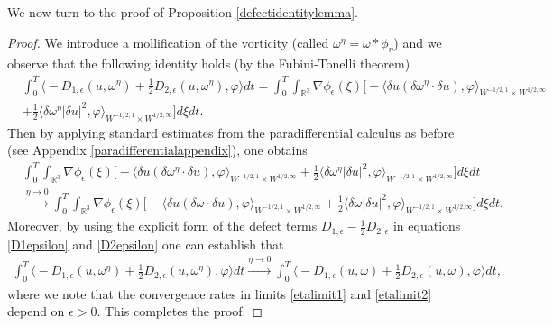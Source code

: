 \documentclass[12pt,a4paper]{article}
\theoremstyle{definition}
\theoremstyle{remark}
\numberwithin{equation}{section}
\begin{document}
We now turn to the proof of Proposition \ref{defectidentitylemma}.
\begin{proof}
We introduce a mollification of the vorticity (called $\omega^\eta = \omega * \phi_\eta$) and we observe that the following identity holds (by the Fubini-Tonelli theorem)
\begingroup
\allowdisplaybreaks
\begin{align}
&\int_0^T \bigg\langle - D_{1,\epsilon} (u, \omega^\eta) + \frac{1}{2} D_{2,\epsilon} (u, \omega^\eta) , \varphi \bigg\rangle dt = \int_0^T \int_{\mathbb{R}^3} \nabla \phi_\epsilon (\xi) \bigg[- \langle \delta u (\delta \omega^\eta \cdot \delta u), \varphi \rangle_{W^{-1/2,1} \times W^{1/2,\infty}} \nonumber \\
&+ \frac{1}{2} \langle \delta \omega^\eta \lvert \delta u \rvert^2 , \varphi \rangle_{W^{-1/2,1} \times W^{1/2,\infty}} \bigg] d \xi dt. \nonumber
\end{align}
\endgroup
Then by applying standard estimates from the paradifferential calculus as before (see Appendix \ref{paradifferentialappendix}), one obtains
\begin{align}
&\int_0^T \int_{\mathbb{R}^3} \nabla \phi_\epsilon (\xi) \bigg[- \langle \delta u (\delta \omega^\eta \cdot \delta u), \varphi \rangle_{W^{-1/2,1} \times W^{1/2,\infty}} + \frac{1}{2} \langle \delta \omega^\eta \lvert \delta u \rvert^2 , \varphi \rangle_{W^{-1/2,1} \times W^{1/2,\infty}} \bigg] d \xi dt \nonumber \\
&\xrightarrow[]{\eta \rightarrow 0} \int_0^T \int_{\mathbb{R}^3} \nabla \phi_\epsilon (\xi) \bigg[- \langle \delta u (\delta \omega \cdot \delta u), \varphi \rangle_{W^{-1/2,1} \times W^{1/2,\infty}} + \frac{1}{2} \langle \delta \omega \lvert \delta u \rvert^2 , \varphi \rangle_{W^{-1/2,1} \times W^{1/2,\infty}} \bigg] d \xi dt. \label{etalimit1}
\end{align}
Moreover, by using the explicit form of the defect terms $D_{1,\epsilon} - \frac{1}{2} D_{2,\epsilon}$ in equations \eqref{D1epsilon} and \eqref{D2epsilon} one can establish that
\begin{align}
\int_0^T \bigg\langle - D_{1,\epsilon} (u, \omega^\eta) + \frac{1}{2} D_{2,\epsilon} (u, \omega^\eta) , \varphi \bigg\rangle dt \xrightarrow[]{\eta \rightarrow 0 } \int_0^T \bigg\langle - D_{1,\epsilon} (u, \omega) + \frac{1}{2} D_{2,\epsilon} (u, \omega) , \varphi \bigg\rangle dt, \label{etalimit2}
\end{align}
where we note that the convergence rates in limits \eqref{etalimit1} and \eqref{etalimit2} depend on $\epsilon > 0$. This completes the proof.
\end{proof}
\end{document}
